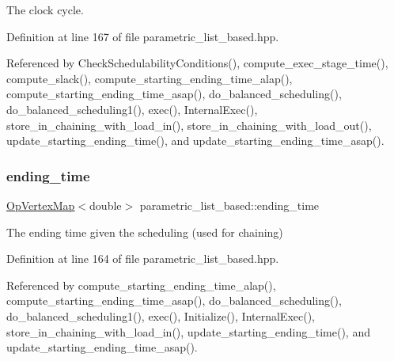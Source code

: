 The clock cycle. 



Definition at line 167 of file parametric\+\_\+list\+\_\+based.\+hpp.



Referenced by Check\+Schedulability\+Conditions(), compute\+\_\+exec\+\_\+stage\+\_\+time(), compute\+\_\+slack(), compute\+\_\+starting\+\_\+ending\+\_\+time\+\_\+alap(), compute\+\_\+starting\+\_\+ending\+\_\+time\+\_\+asap(), do\+\_\+balanced\+\_\+scheduling(), do\+\_\+balanced\+\_\+scheduling1(), exec(), Internal\+Exec(), store\+\_\+in\+\_\+chaining\+\_\+with\+\_\+load\+\_\+in(), store\+\_\+in\+\_\+chaining\+\_\+with\+\_\+load\+\_\+out(), update\+\_\+starting\+\_\+ending\+\_\+time(), and update\+\_\+starting\+\_\+ending\+\_\+time\+\_\+asap().

\mbox{\label{classparametric__list__based_a0b92fb6107c2c1bdb966db10baf57a30}} 
\subsubsection{\texorpdfstring{ending\+\_\+time}{ending\_time}}
{\footnotesize\ttfamily \hyperlink{classOpVertexMap}{Op\+Vertex\+Map}$<$double$>$ parametric\+\_\+list\+\_\+based\+::ending\+\_\+time\hspace{0.3cm}{\ttfamily [private]}}



The ending time given the scheduling (used for chaining) 



Definition at line 164 of file parametric\+\_\+list\+\_\+based.\+hpp.



Referenced by compute\+\_\+starting\+\_\+ending\+\_\+time\+\_\+alap(), compute\+\_\+starting\+\_\+ending\+\_\+time\+\_\+asap(), do\+\_\+balanced\+\_\+scheduling(), do\+\_\+balanced\+\_\+scheduling1(), exec(), Initialize(), Internal\+Exec(), store\+\_\+in\+\_\+chaining\+\_\+with\+\_\+load\+\_\+in(), update\+\_\+starting\+\_\+ending\+\_\+time(), and update\+\_\+starting\+\_\+ending\+\_\+time\+\_\+asap().

\mbox{\label{classparametric__list__based_a25940f1c2f39d4ae48464c75e19f89d0}} 
